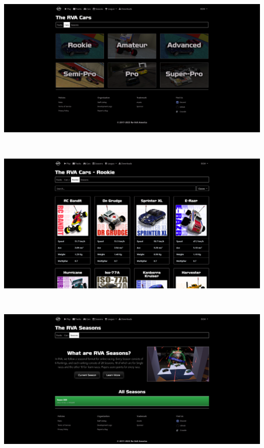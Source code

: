 \includegraphics[width=15cm, height=8cm]{img/cars.png} \\

\includegraphics[width=15cm, height=8cm]{img/cars2.png} \\

\includegraphics[width=15cm, height=8cm]{img/seasons.png} \\

